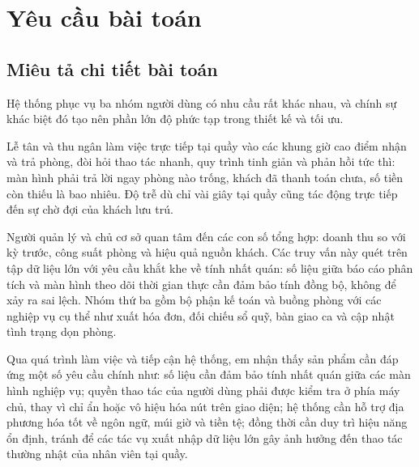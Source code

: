 \section{Yêu cầu bài toán}

\subsection{Miêu tả chi tiết bài toán}

Hệ thống phục vụ ba nhóm người dùng có nhu cầu rất khác nhau, và chính sự khác biệt đó tạo nên phần lớn độ phức tạp trong thiết kế và tối ưu.

Lễ tân và thu ngân làm việc trực tiếp tại quầy vào các khung giờ cao điểm nhận và trả phòng, đòi hỏi thao tác nhanh, quy trình tinh giản và phản hồi tức thì: màn hình phải trả lời ngay phòng nào trống, khách đã thanh toán chưa, số tiền còn thiếu là bao nhiêu. Độ trễ dù chỉ vài giây tại quầy cũng tác động trực tiếp đến sự chờ đợi của khách lưu trú.

Người quản lý và chủ cơ sở quan tâm đến các con số tổng hợp: doanh thu so với kỳ trước, công suất phòng và hiệu quả nguồn khách. Các truy vấn này quét trên tập dữ liệu lớn với yêu cầu khắt khe về tính nhất quán: số liệu giữa báo cáo phân tích và màn hình theo dõi thời gian thực cần đảm bảo tính đồng bộ, không để xảy ra sai lệch. Nhóm thứ ba gồm bộ phận kế toán và buồng phòng với các nghiệp vụ cụ thể như xuất hóa đơn, đối chiếu sổ quỹ, bàn giao ca và cập nhật tình trạng dọn phòng.

Qua quá trình làm việc và tiếp cận hệ thống, em nhận thấy sản phẩm cần đáp ứng một số yêu cầu chính như: số liệu cần đảm bảo tính nhất quán giữa các màn hình nghiệp vụ; quyền thao tác của người dùng phải được kiểm tra ở phía máy chủ, thay vì chỉ ẩn hoặc vô hiệu hóa nút trên giao diện; hệ thống cần hỗ trợ địa phương hóa tốt về ngôn ngữ, múi giờ và tiền tệ; đồng thời cần duy trì hiệu năng ổn định, tránh để các tác vụ xuất nhập dữ liệu lớn gây ảnh hưởng đến thao tác thường nhật của nhân viên tại quầy.

